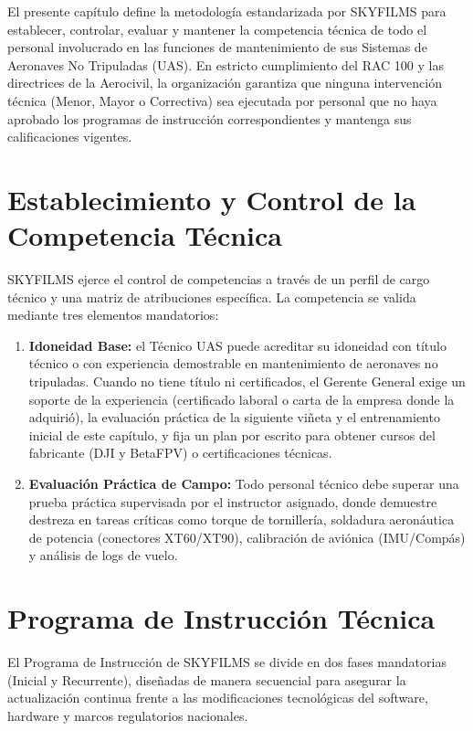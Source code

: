 El presente capítulo define la metodología estandarizada por SKYFILMS para establecer, controlar, evaluar y mantener la competencia técnica de todo el personal involucrado en las funciones de mantenimiento de sus Sistemas de Aeronaves No Tripuladas (UAS). En estricto cumplimiento del RAC 100 y las directrices de la Aerocivil, la organización garantiza que ninguna intervención técnica (Menor, Mayor o Correctiva) sea ejecutada por personal que no haya aprobado los programas de instrucción correspondientes y mantenga sus calificaciones vigentes.

\section{Establecimiento y Control de la Competencia Técnica}
SKYFILMS ejerce el control de competencias a través de un perfil de cargo técnico y una matriz de atribuciones específica. La competencia se valida mediante tres elementos mandatorios:

\begin{enumerate}
    \item \textbf{Idoneidad Base:} el Técnico UAS puede acreditar su idoneidad con título técnico o con experiencia demostrable en mantenimiento de aeronaves no tripuladas. Cuando no tiene título ni certificados, el Gerente General exige un soporte de la experiencia (certificado laboral o carta de la empresa donde la adquirió), la evaluación práctica de la siguiente viñeta y el entrenamiento inicial de este capítulo, y fija un plan por escrito para obtener cursos del fabricante (DJI y BetaFPV) o certificaciones técnicas.
    \item \textbf{Evaluación Práctica de Campo:} Todo personal técnico debe superar una prueba práctica supervisada por el instructor asignado, donde demuestre destreza en tareas críticas como torque de tornillería, soldadura aeronáutica de potencia (conectores XT60/XT90), calibración de aviónica (IMU/Compás) y análisis de logs de vuelo.
\end{enumerate}

\section{Programa de Instrucción Técnica}
El Programa de Instrucción de SKYFILMS se divide en dos fases mandatorias (Inicial y Recurrente), diseñadas de manera secuencial para asegurar la actualización continua frente a las modificaciones tecnológicas del software, hardware y marcos regulatorios nacionales.

